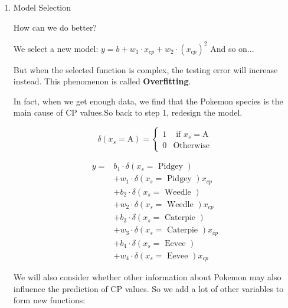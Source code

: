 \documentclass{article}
\begin{document}
\begin{enumerate}
\begin{tipsblock}{Gradient}
    \end{tipsblock}

    By calculating, we get $b=-188.4,w=2.7$ and errors in training data is $\sum e^n = 31.9$.
    
    Actually, we don't care errors in training data.What we really care about is the error on new data (testing data).

    So, we get another 10 Pokemon as testing data. The errors is $\sum e^n = 35.0 >$ training data error.

    \item Model Selection

    How can we do better?
    
    We select a new model: 
    $y=b+w_1\cdot x_{cp}+w_2\cdot(x_{cp})^2$
    And so on... 

    But when the selected function is complex, the testing error will increase instead. This phenomenon is called \textbf{Overfitting}.

    In fact, when we get enough data, we find that the Pokemon species is the main cause of CP values.So back to step 1, redesign the model.

    $$
    \delta(x_s=\text{A})=\begin{cases}
     1 & \text{ if } x_s=\text{A}\\
     0 & \text{Otherwise}
    \end{cases}
    $$

    $$
    \begin{aligned} y= & b_{1} \cdot \delta\left(x_{s}=\text { Pidgey }\right) \\ & +w_{1} \cdot \delta\left(x_{s}=\text { Pidgey }\right) x_{c p} \\ & +b_{2} \cdot \delta\left(x_{s}=\text { Weedle }\right) \\ & +w_{2} \cdot \delta\left(x_{s}=\text { Weedle }\right) x_{c p} \\ & +b_{3} \cdot \delta\left(x_{s}=\text { Caterpie }\right) \\ & +w_{3} \cdot \delta\left(x_{s}=\text { Caterpie }\right) x_{c p} \\ & +b_{4} \cdot \delta\left(x_{s}=\text { Eevee }\right) \\ & +w_{4} \cdot \delta\left(x_{s}=\text { Eevee }\right) x_{c p}\end{aligned}
    $$

    We will also consider whether other information about Pokemon may also influence the prediction of CP values. So we add a lot of other variables to form new functions:


\end{enumerate}
\end{document}
